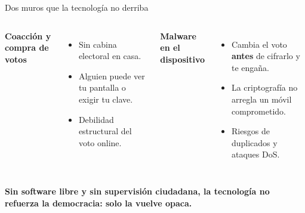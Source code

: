 \documentclass[aspectratio=169,12pt]{beamer}
\begin{document}
\begin{frame}{Dos muros que la tecnología no derriba}
  \begin{columns}[T]
      {\color{terra}\large\bfseries Coacción y compra de votos}\\[0.15cm]
      \begin{itemize}
        \item Sin cabina electoral en casa.
        \item Alguien puede ver tu pantalla o exigir tu clave.
        \item Debilidad estructural del voto online.
      \end{itemize}
      {\color{terra}\large\bfseries Malware en el dispositivo}\\[0.15cm]
      \begin{itemize}
        \item Cambia el voto \textbf{antes} de cifrarlo y te engaña.
        \item La criptografía no arregla un móvil comprometido.
        \item Riesgos de duplicados y ataques DoS.
      \end{itemize}
  \end{columns}
  \vspace{0.25cm}
  \begin{center}
    {\normalsize\alert{\textbf{Sin software libre y sin supervisión ciudadana, la tecnología no refuerza la democracia: solo la vuelve opaca.}}}
  \end{center}
\end{frame}
\end{document}
